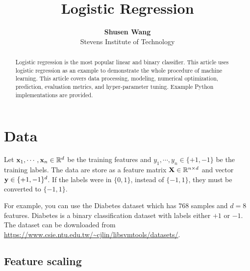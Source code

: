 \documentclass[11pt]{article}
\numberwithin{equation}{section}
\def\X{{\bf X}}
\def\x{{\bf x}}
\def\y{{\bf y}}
\def\RB{{\mathbb R}}
\begin{document}


\title{Logistic Regression}

\author{\textbf{Shusen Wang} \\ Stevens Institute of Technology}


\maketitle

\begin{abstract}
	Logistic regression is the most popular linear and binary classifier.
	This article uses logistic regression as an example to demonstrate the whole procedure of machine learning.
	This article covers data processing, modeling, numerical optimization, prediction, evaluation metrics, and hyper-parameter tuning.
	Example Python implementations are provided. 
\end{abstract}

\section{Data}





Let $\x_1, \cdots , \x_n \in \RB^d$ be the training features and $y_1 , \cdots , y_n \in \{+1, -1\}$ be the training labels.
The data are store as a feature matrix $\X \in \RB^{n\times d}$ and vector $\y \in \{+1, -1\}^d$.
If the labels were in $\{0, 1\}$, instead of $\{-1, 1\}$, they must be converted to $\{-1, 1\}$.

For example, you can use the Diabetes dataset which has $768$ samples and $d=8$ features.
Diabetes is a binary classification dataset with labels either $+1$ or $-1$.
The dataset can be downloaded from \url{https://www.csie.ntu.edu.tw/~cjlin/libsvmtools/datasets/}.


\subsection*{Feature scaling}

\end{document}
